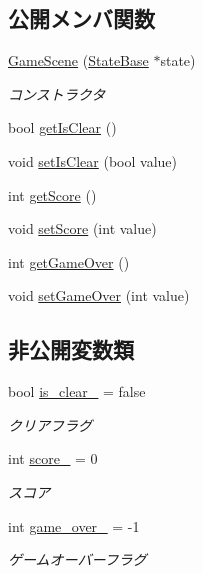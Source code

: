 \subsection*{公開メンバ関数}
\begin{DoxyCompactItemize}
\item 
\mbox{\hyperlink{class_game_scene_a25e9e82ce85255dac27cd6489751bd40}{Game\+Scene}} (\mbox{\hyperlink{class_scene_base_1_1_state_base}{State\+Base}} $\ast$state)
\begin{DoxyCompactList}\small\item\em コンストラクタ \end{DoxyCompactList}\item 
bool \mbox{\hyperlink{class_game_scene_a56604f01c0fa914660c3d8b788a94405}{get\+Is\+Clear}} ()
\item 
void \mbox{\hyperlink{class_game_scene_a1bd84ecb8d44bd5e57b4a2d772ef1bf9}{set\+Is\+Clear}} (bool value)
\item 
int \mbox{\hyperlink{class_game_scene_a16b26b3b8ea91dcaf762292414bf5d6d}{get\+Score}} ()
\item 
void \mbox{\hyperlink{class_game_scene_a853fefbf82ff85b9f34e325108ae7e3b}{set\+Score}} (int value)
\item 
int \mbox{\hyperlink{class_game_scene_a2f8413f473bc9a937fa02bfd4678d61d}{get\+Game\+Over}} ()
\item 
void \mbox{\hyperlink{class_game_scene_abaefc8ae1bd5625d79da25120ef33a8e}{set\+Game\+Over}} (int value)
\end{DoxyCompactItemize}
\subsection*{非公開変数類}
\begin{DoxyCompactItemize}
\item 
bool \mbox{\hyperlink{class_game_scene_a48cf67b81c80718df80ee03aa6e73e74}{is\+\_\+clear\+\_\+}} = false
\begin{DoxyCompactList}\small\item\em クリアフラグ \end{DoxyCompactList}\item 
int \mbox{\hyperlink{class_game_scene_afe49ee089b9ad8415f7ab432a3c554aa}{score\+\_\+}} = 0
\begin{DoxyCompactList}\small\item\em スコア \end{DoxyCompactList}\item 
int \mbox{\hyperlink{class_game_scene_a92b5476dc1536c43b604bef51cc36c70}{game\+\_\+over\+\_\+}} = -\/1
\begin{DoxyCompactList}\small\item\em ゲームオーバーフラグ \end{DoxyCompactList}\end{DoxyCompactItemize}


